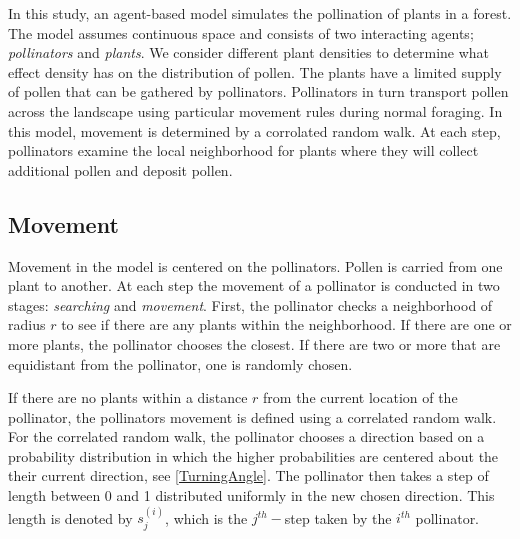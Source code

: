 In this study, an agent-based model simulates the pollination of plants in a
forest. The model assumes continuous space and consists of two interacting
agents; \emph{pollinators} and \emph{plants}.  We consider different plant
densities to determine what effect density has on the distribution of pollen.
The plants have a limited supply of pollen that can be gathered by pollinators.
Pollinators in turn transport pollen across the landscape using particular
movement rules during normal foraging.  In this model, movement is determined by
a corrolated random walk.  At each step, pollinators examine the local
neighborhood for plants where they will collect additional pollen and deposit
pollen.

\subsection{Movement}
Movement in the model is centered on the pollinators.  Pollen is carried from
one plant to another.  At each step the movement of a pollinator is conducted in
two stages: \emph{searching} and \emph{movement}.  First, the pollinator checks
a neighborhood of radius $r$ to see if there are any plants within the
neighborhood.  If there are one or more plants, the pollinator chooses the
closest.  If there are two or more that are equidistant from the pollinator, one
is randomly chosen.

If there are no plants within a distance $r$ from the current location of the
pollinator, the pollinators movement is defined using a correlated random walk.
For the correlated random walk, the pollinator chooses a direction based on a
probability distribution in which the higher probabilities are centered about
the their current direction, see \autoref{TurningAngle}.  The pollinator then
takes a step of length between 0 and 1 distributed uniformly in the new chosen
direction.  This length is denoted by $s_j^{(i)}$, which is the $j^{th}-$step
taken by the $i^{th}$ pollinator.

